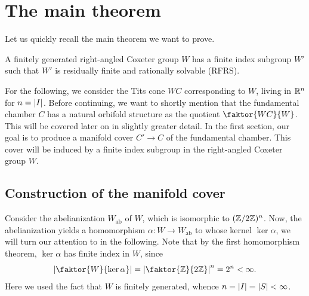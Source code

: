 \chapter{The main theorem}

Let us quickly recall the main theorem we want to prove.

\begin{theorem*}
    A finitely generated right-angled Coxeter group \(W\) has a finite index subgroup \(W'\) such that \(W'\) is residually finite and rationally solvable (RFRS).
\end{theorem*}

For the following, we consider the Tits cone \(WC\) corresponding to \(W\), living in \(\mathbb{R}^n\) for \(n = \left\vert I\right\vert\).
Before continuing, we want to shortly mention that the fundamental chamber \(C\) has a natural orbifold structure as the quotient \(\faktor{WC}{W}\). %
This will be covered later on in slightly greater detail.
In the first section, our goal is to produce a manifold cover \(C' \to C\) of the fundamental chamber.
This cover will be induced by a finite index subgroup in the right-angled Coxeter group \(W\).


\section{Construction of the manifold cover}

Consider the abelianization \(W_{\text{ab}}\) of \(W\), which is isomorphic to \((\mathbb{Z}/2\mathbb{Z})^{n}\).
Now, the abelianization yields a homomorphism \(\alpha : W \to W_{\text{ab}}\) to whose kernel \(\ker\alpha\), we will turn our attention to in the following.
Note that by the first homomorphism theorem, \(\ker\alpha\) has finite index in \(W\), since
\[\abs{\faktor{W}{\ker\alpha}} = \abs{\faktor{\Z}{2\Z}}^{n} = 2^{n} < \infty.\]
Here we used the fact that \(W\) is finitely generated, whence \(n = \left\vert I\right\vert = \left\vert S\right\vert < \infty\).

